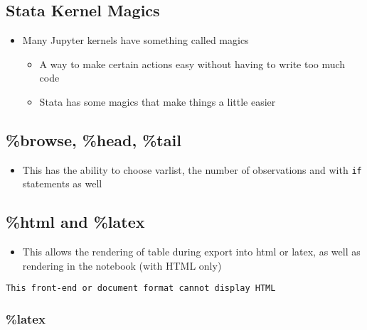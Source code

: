 \documentclass[10pt,parskip=half,
	toc=sectionentrywithdots,
	bibliography=totocnumbered,
	captions=tableheading,numbers=noendperiod]{scrartcl}
\providecommand{\tightlist}{%
  \setlength{\itemsep}{0pt}\setlength{\parskip}{0pt}}
\begin{document}
\hypertarget{stata-kernel-magics}{%
\subsection{Stata Kernel Magics}\label{stata-kernel-magics}}

\begin{itemize}
\tightlist
\item
  Many Jupyter kernels have something called magics

  \begin{itemize}
  \tightlist
  \item
    A way to make certain actions easy without having to write too much
    code
  \item
    Stata has some magics that make things a little easier
  \end{itemize}
\end{itemize}

\hypertarget{browse-head-tail}{%
\subsection{\%browse, \%head, \%tail}\label{browse-head-tail}}

\begin{itemize}
\tightlist
\item
  This has the ability to choose varlist, the number of observations and
  with \texttt{if} statements as well
\end{itemize}

\hypertarget{html-and-latex}{%
\subsection{\%html and \%latex}\label{html-and-latex}}

\begin{itemize}
\tightlist
\item
  This allows the rendering of table during export into html or latex,
  as well as rendering in the notebook (with HTML only)
\end{itemize}

\begin{lstlisting}[language={},postbreak={},numbers=none,xrightmargin=7pt,breakindent=0pt,aboveskip=5pt,belowskip=5pt]
This front-end or document format cannot display HTML
\end{lstlisting}

\hypertarget{latex}{%
\subsubsection{\%latex}\label{latex}}
\end{document}
